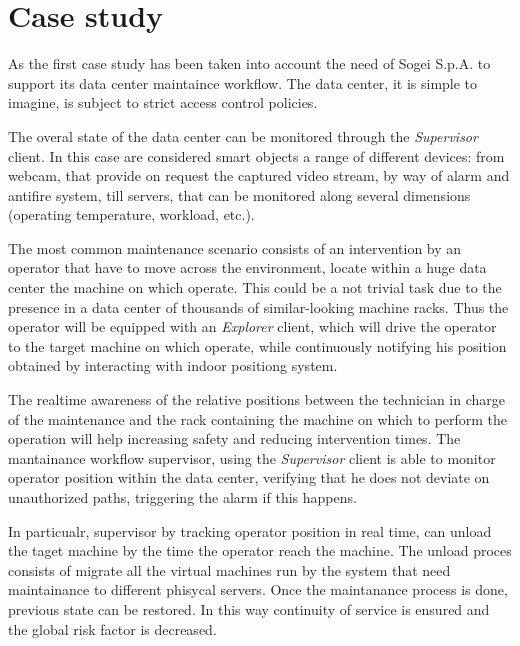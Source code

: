 \section{Case study}\label{case-study}

As the first case study has been taken into account the need of Sogei S.p.A. to support its data center maintaince workflow. The data center, it is simple to imagine, is subject to strict access control policies. 

The overal state of the data center can be monitored through the \emph{Supervisor} client. In this case are considered smart objects a range of different devices: from webcam, that provide on request the captured video stream, by way of alarm and antifire system, till servers, that can be monitored along several dimensions (operating temperature, workload, etc.). 

The most common maintenance scenario consists of an intervention by an operator that have to move across the environment,
locate within a huge data center the machine on which operate. This could be a not trivial task due to the presence in a data center of thousands of similar-looking machine racks. Thus the operator will be equipped with an \emph{Explorer} client, which will drive the operator to the target machine on which operate, while continuously notifying his position obtained by interacting with indoor positiong system.

The real­time awareness of the relative positions between the technician in charge of the maintenance and the rack ­containing the machine­ on which to perform the operation will help increasing safety and reducing intervention times. The mantainance workflow supervisor, using the \emph{Supervisor} client is able to monitor operator position within the data center, verifying that he does not deviate on unauthorized paths, triggering the alarm if this happens.

In particualr, supervisor by tracking operator position in real time, can unload the taget machine by the time the operator reach the machine. The unload proces consists of migrate all the virtual machines run by the system that need maintainance to different phisycal servers. Once the maintanance process is done, previous state can be restored. In this way continuity of service is ensured and the global risk factor is decreased.



